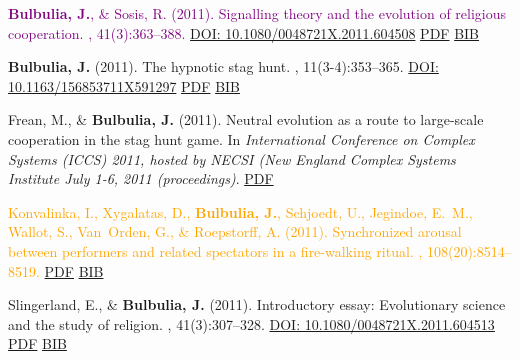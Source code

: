 \documentclass{article}
\begin{document}
\begin{thebibliography}{99}
\textcolor{Purple}{
{\bf Bulbulia, J.}, \& Sosis, R. (2011).
\newblock Signalling theory and the evolution of religious cooperation.
, 41(3):363--388. 
\href{https://doi.org/10.1080/0048721X.2011.604508}{DOI: 10.1080/0048721X.2011.604508}}
\newblock \href{https://www.dropbox.com/s/j0zb0a74ut3j93r/Bulbulia_Sosis_Signalling_2011.pdf}{PDF} \href{https://www.dropbox.com/s/yxcfyzqa8d342em/sig.theory.bul.sos.bib?dl=0}{BIB}


{\bf Bulbulia, J.} (2011).
\newblock The hypnotic stag hunt.
, 11(3-4):353--365. 
\href{https://doi.org/10.1163/156853711X591297}{DOI: 10.1163/156853711X591297}
 \href{https://www.dropbox.com/s/ngdi2ldwnny7sd8/JOCC_011_03-04_06-Bulbulia.pdf}{PDF} \href{https://www.dropbox.com/s/o5lkyk8uvsuytn1/Hypnotic.bib?dl=0}{BIB}


Frean, M., \& {\bf Bulbulia, J.} (2011).
\newblock Neutral evolution as a route to large-scale cooperation in the stag
  hunt game.
\newblock In {\em International Conference on Complex Systems (ICCS) 2011,
  hosted by NECSI (New England Complex Systems Institute July 1-6, 2011
  (proceedings)}.
  \href{https://www.dropbox.com/s/bn4p7ry1cwz2v76/ICCS-259-FreanBulbulia.pdf?dl=0}{PDF}
 

\textcolor{Orange}{Konvalinka, I., Xygalatas, D., {\bf Bulbulia, J.}, Schjoedt, U., Jegindoe, E.~M.,
  Wallot, S., Van~Orden, G., \& Roepstorff, A. (2011).
\newblock Synchronized arousal between performers and related spectators in a
  fire-walking ritual.
,
  108(20):8514--8519.}  \href{https://www.dropbox.com/s/e9kw1bc58arqcum/1016955108-1.full.pdf}{PDF} \href{https://scholar.google.co.nz/scholar.bib?q=info:Z4bz7lwp7CAJ:scholar.google.com/&output=citation&scisig=AAGBfm0AAAAAVQLQj1q3zL48FKlyJACORNS7cgksQjIL&scisf=4&hl=en}{BIB}


Slingerland, E., \& {\bf Bulbulia, J.} (2011).
\newblock Introductory essay: Evolutionary science and the study of religion.
, 41(3):307--328. 
\href{https://doi.org/10.1080/0048721X.2011.604513 }{DOI: 10.1080/0048721X.2011.604513}
	\newblock \href{https://www.dropbox.com/s/w7om74yu1byjces/Slingerland_Bulbulia_2011.pdf?dl=0}{PDF} \href{https://scholar.google.co.nz/scholar.bib?q=info:EuqNIKJICaAJ:scholar.google.com/&output=citation&scisig=AAGBfm0AAAAAVQLQF9j3ZcOMiq4s0i0IlD2LvlZZY93D&scisf=4&hl=en}{BIB}



\end{thebibliography}
\end{document}
